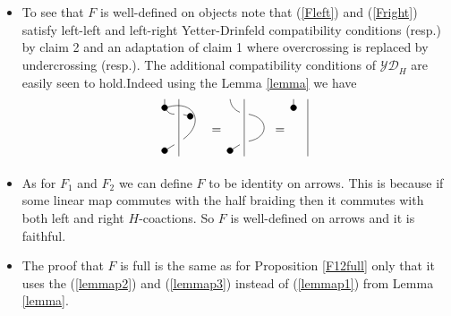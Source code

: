 \documentclass{article}
\begin{document}
\begin{itemize}
	\item To see that $F$ is well-defined on objects note that (\ref{Fleft}) and (\ref{Fright}) satisfy left-left and left-right Yetter-Drinfeld compatibility conditions (resp.) by claim 2 and an adaptation of claim 1 where overcrossing is replaced by undercrossing (resp.). The additional compatibility conditions of $\mathcal{YD}_H$ are easily seen to hold.Indeed using the Lemma \ref{lemma} we have
	\begin{equation}
		\begin{gathered}
		\begin{tikzpicture}[scale=0.8]
			\node (0) at (0,0.5) {};
			\node (1) at (0,-0.5) {};
			\node [scale=0.5, draw, circle, fill=black] (b1) at (-0.5,0.7) {};
			\node [scale=0.5, draw, circle, fill=black] (b2) at (-0.5,-0.8) {};
			\node [scale=0.5, draw, circle, fill=black] (b3) at (0.4,0.4) {};
			\draw (0,-1)--(0,1);
			\draw (b2)--(1);
			\draw (b3)--(0);
			\draw [bend right] (b1) to (0);
			\draw (b1) to (-0.5,1);
			\draw [bend right=80, looseness=2] (1) to (b1);
		\end{tikzpicture}
		\end{gathered}
		\, = \,
		\begin{gathered}
		\begin{tikzpicture}[scale=0.8]
		\node (0) at (0,0.5) {};
		\node (1) at (0,-0.5) {};
		\node [scale=0.5, draw, circle, fill=black] (b2) at (-0.5,-0.8) {};
		\draw (0,-1)--(0,1);
		\draw (b2)--(1);
		\draw [bend left] (0) to (-0.5,1);
		\draw [bend right=80, looseness=2] (1) to (0);
		\end{tikzpicture}
		\end{gathered}
		\, = \,
		\begin{gathered}
		\begin{tikzpicture}[scale=0.8]
		\node (0) at (0,0.5) {};
		\node (1) at (0,-0.5) {};
		\node [scale=0.5, draw, circle, fill=black] (b2) at (-0.5,0.7) {};
		\draw (0,-1)--(0,1);
		\draw (b2)--(-0.5,1);
		\end{tikzpicture}
		\end{gathered}
	\end{equation}
	\item As for $F_1$ and $F_2$ we can define $F$ to be identity on arrows. This is because if some linear map commutes with the half braiding then it commutes with both left and right $H$-coactions. So $F$ is well-defined on arrows and it is faithful.
	\item The proof that $F$ is full is the same as for Proposition \ref{F12full} only that it uses the (\ref{lemmap2}) and (\ref{lemmap3}) instead of (\ref{lemmap1}) from Lemma \ref{lemma}.

\end{itemize}
\end{document}
